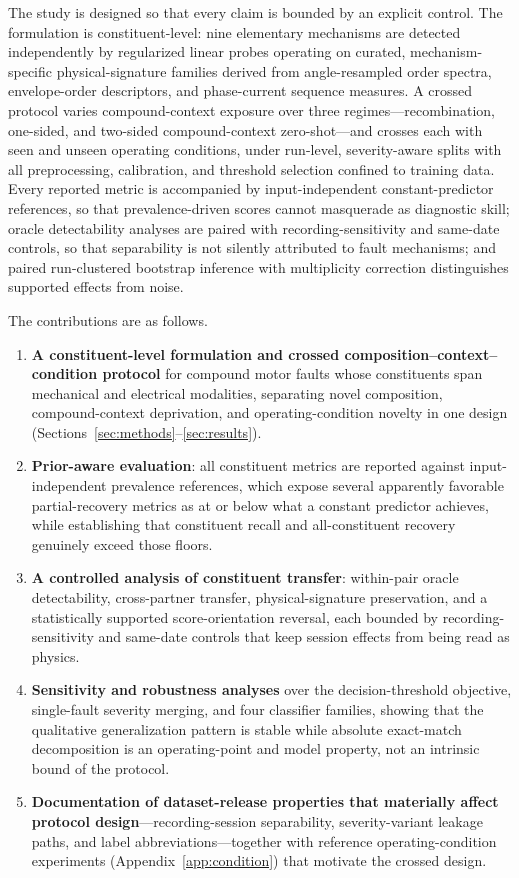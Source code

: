 The study is designed so that every claim is bounded by an explicit control.
The formulation is constituent-level: nine elementary mechanisms are detected
independently by regularized linear probes operating on curated,
mechanism-specific physical-signature families derived from angle-resampled
order spectra, envelope-order descriptors, and phase-current sequence
measures. A crossed protocol varies compound-context exposure over three
regimes---recombination, one-sided, and two-sided compound-context
zero-shot---and crosses each with seen and unseen operating conditions, under
run-level, severity-aware splits with all preprocessing, calibration, and
threshold selection confined to training data. Every reported metric is
accompanied by input-independent constant-predictor references, so that
prevalence-driven scores cannot masquerade as diagnostic skill; oracle
detectability analyses are paired with recording-sensitivity and same-date
controls, so that separability is not silently attributed to fault
mechanisms; and paired run-clustered bootstrap inference with multiplicity
correction distinguishes supported effects from noise.

The contributions are as follows.
\begin{enumerate}
  \item \textbf{A constituent-level formulation and crossed
  composition--context--condition protocol} for compound motor faults whose
  constituents span mechanical and electrical modalities, separating novel
  composition, compound-context deprivation, and operating-condition novelty
  in one design (Sections~\ref{sec:methods}--\ref{sec:results}).
  \item \textbf{Prior-aware evaluation}: all constituent metrics are reported
  against input-independent prevalence references, which expose several
  apparently favorable partial-recovery metrics as at or below what a
  constant predictor achieves, while establishing that constituent recall and
  all-constituent recovery genuinely exceed those floors.
  \item \textbf{A controlled analysis of constituent transfer}: within-pair
  oracle detectability, cross-partner transfer, physical-signature
  preservation, and a statistically supported score-orientation reversal,
  each bounded by recording-sensitivity and same-date controls that keep
  session effects from being read as physics.
  \item \textbf{Sensitivity and robustness analyses} over the decision-threshold
  objective, single-fault severity merging, and four classifier families,
  showing that the qualitative generalization pattern is stable while
  absolute exact-match decomposition is an operating-point and model
  property, not an intrinsic bound of the protocol.
  \item \textbf{Documentation of dataset-release properties that materially
  affect protocol design}---recording-session separability, severity-variant
  leakage paths, and label abbreviations---together with reference
  operating-condition experiments (Appendix~\ref{app:condition}) that
  motivate the crossed design.
\end{enumerate}

